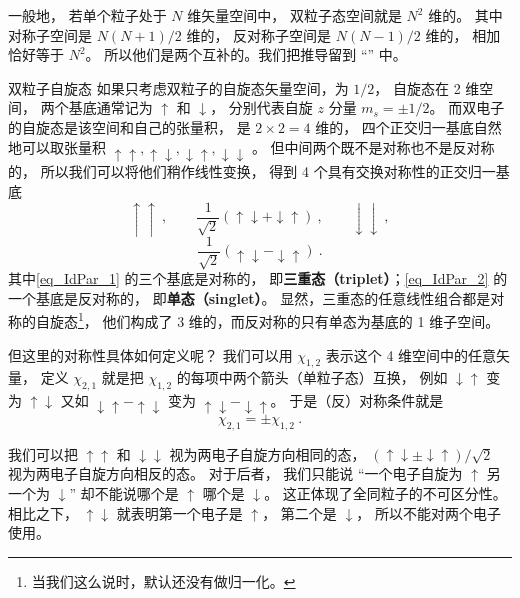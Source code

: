 一般地， 若单个粒子处于 $N$ 维矢量空间中， 双粒子态空间就是 $N^2$ 维的。 其中对称子空间是 $N(N+1)/2$ 维的， 反对称子空间是 $N(N-1)/2$ 维的， 相加恰好等于 $N^2$。 所以他们是两个互补的。我们把推导留到 “” 中。

\begin{example}{双粒子自旋态}\label{ex_IdPar_1}
如果只考虑双粒子的自旋态矢量空间，为 $1/2$， 自旋态在 2 维空间， 两个基底通常记为 $\uparrow$ 和 $\downarrow$， 分别代表自旋 $z$ 分量 $m_s=\pm 1/2$。 而双电子的自旋态是该空间和自己的张量积， 是 $2\times2 = 4$ 维的， 四个正交归一基底自然地可以取张量积 $\uparrow\uparrow, \uparrow\downarrow, \downarrow\uparrow, \downarrow\downarrow$ 。 但中间两个既不是对称也不是反对称的， 所以我们可以将他们稍作线性变换， 得到 4 个具有交换对称性的正交归一基底
\begin{equation}\label{eq_IdPar_1}
\uparrow\uparrow ~,\qquad \frac{1}{\sqrt 2}(\uparrow\downarrow + \downarrow\uparrow)~,\qquad \downarrow\downarrow~,
\end{equation}
\begin{equation}\label{eq_IdPar_2}
\frac{1}{\sqrt 2}(\uparrow\downarrow - \downarrow\uparrow)~.
\end{equation}
其中\autoref{eq_IdPar_1} 的三个基底是对称的， 即\textbf{三重态（triplet）}；\autoref{eq_IdPar_2} 的一个基底是反对称的， 即\textbf{单态（singlet）}。 %
显然，三重态的任意线性组合都是对称的自旋态\footnote{当我们这么说时，默认还没有做归一化。}， 他们构成了 3 维的，而反对称的只有单态为基底的 1 维子空间。

但这里的对称性具体如何定义呢？ 我们可以用 $\chi_{1,2}$ 表示这个 4 维空间中的任意矢量， 定义 $\chi_{2,1}$ 就是把 $\chi_{1,2}$ 的每项中两个箭头（单粒子态）互换， 例如 $\downarrow\uparrow$ 变为 $\uparrow\downarrow$ 又如 $\downarrow\uparrow - \uparrow\downarrow$ 变为 $\uparrow\downarrow - \downarrow\uparrow$。 于是（反）对称条件就是
\begin{equation}\label{eq_IdPar_3}
\chi_{2,1} = \pm\chi_{1,2}~.
\end{equation}

我们可以把 $\uparrow\uparrow$ 和 $\downarrow\downarrow$ 视为两电子自旋方向相同的态， $(\uparrow\downarrow \pm \downarrow\uparrow)/\sqrt{2}$ 视为两电子自旋方向相反的态。 对于后者， 我们只能说 “一个电子自旋为 $\uparrow$ 另一个为 $\downarrow$” 却不能说哪个是 $\uparrow$ 哪个是 $\downarrow$。 这正体现了全同粒子的不可区分性。 相比之下， $\uparrow\downarrow$ 就表明第一个电子是 $\uparrow$， 第二个是 $\downarrow$， 所以不能对两个电子使用。
\end{example}


